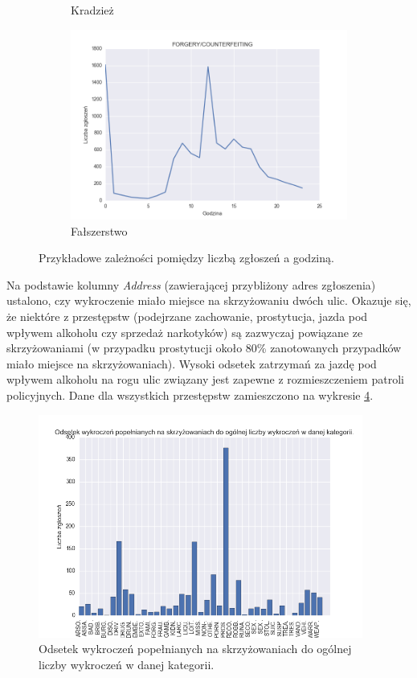\documentclass[11pt]{article} %
\begin{document}
\begin{figure}[h]
\begin{subfigure}{0.48\linewidth}
   \caption{Kradzież}
   \label{fig:crimes_per_hour_5} 
\end{subfigure}
\hfill
\begin{subfigure}{0.48\linewidth}
   \centering
   \includegraphics[width=\linewidth]{images/crimes_per_hour/12}
   \caption{Fałszerstwo}
   \label{fig:crimes_per_hour_6}
\end{subfigure}
\centering
\caption{Przykładowe zależności pomiędzy liczbą zgłoszeń a godziną.} 
\end{figure}

Na podstawie kolumny \textit{Address} (zawierającej przybliżony adres zgłoszenia) ustalono, czy wykroczenie miało miejsce na skrzyżowaniu dwóch ulic. Okazuje się, że niektóre z przestępstw (podejrzane zachowanie, prostytucja, jazda pod wpływem alkoholu czy sprzedaż narkotyków) są zazwyczaj powiązane ze skrzyżowaniami (w przypadku prostytucji około 80\% zanotowanych przypadków miało miejsce na skrzyżowaniach). Wysoki odsetek zatrzymań za jazdę pod wpływem alkoholu na rogu ulic związany jest zapewne z rozmieszczeniem patroli policyjnych. Dane dla wszystkich przestępstw zamieszczono na wykresie \ref{fig:corner}.

\begin{figure}[!h]
  \centering
    \includegraphics[width=0.95\textwidth]{images/street_corner}
  \caption{Odsetek wykroczeń popełnianych na skrzyżowaniach do ogólnej liczby wykroczeń w danej kategorii.} \label{fig:corner}
\end{figure}
\end{document}
